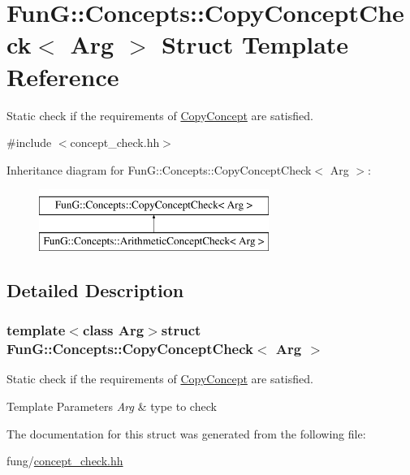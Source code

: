 \hypertarget{structFunG_1_1Concepts_1_1CopyConceptCheck}{}\section{Fun\+G\+:\+:Concepts\+:\+:Copy\+Concept\+Check$<$ Arg $>$ Struct Template Reference}
\label{structFunG_1_1Concepts_1_1CopyConceptCheck}


Static check if the requirements of \hyperlink{structFunG_1_1Concepts_1_1CopyConcept}{Copy\+Concept} are satisfied.  




{\ttfamily \#include $<$concept\+\_\+check.\+hh$>$}

Inheritance diagram for Fun\+G\+:\+:Concepts\+:\+:Copy\+Concept\+Check$<$ Arg $>$\+:\begin{figure}[H]
\begin{center}
\leavevmode
\includegraphics[height=2.000000cm]{structFunG_1_1Concepts_1_1CopyConceptCheck}
\end{center}
\end{figure}


\subsection{Detailed Description}
\subsubsection*{template$<$class Arg$>$struct Fun\+G\+::\+Concepts\+::\+Copy\+Concept\+Check$<$ Arg $>$}

Static check if the requirements of \hyperlink{structFunG_1_1Concepts_1_1CopyConcept}{Copy\+Concept} are satisfied. 


\begin{DoxyTemplParams}{Template Parameters}
{\em Arg} & type to check \\
\hline
\end{DoxyTemplParams}


The documentation for this struct was generated from the following file\+:\begin{DoxyCompactItemize}
\item 
fung/\hyperlink{concept__check_8hh}{concept\+\_\+check.\+hh}\end{DoxyCompactItemize}
